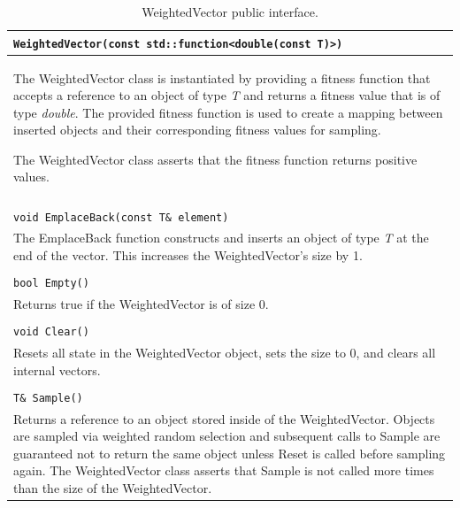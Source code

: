\documentclass[12pt]{article}
\begin{document}
  \begin{table}[htbp] \label{tab:wvpub}
    \caption{WeightedVector public interface.}
    \begin{tabular}{ | p{1.0\linewidth} | }
      \hline
      \verb|WeightedVector(const std::function<double(const T)>)| \\ \hline
      The WeightedVector class is instantiated by providing a fitness function
      that accepts a reference to an object of type \emph{T} and returns a
      fitness value that is of type \emph{double}. The provided fitness function
      is used to create a mapping between inserted objects and their
      corresponding fitness values for sampling.

      The WeightedVector class asserts that the fitness function returns positive
      values. \\ \hline

      \\ \hline

      \verb|void EmplaceBack(const T& element)| \\ \hline
      The EmplaceBack function constructs and inserts an object of type
      \emph{T} at the end of the vector. This increases the WeightedVector's
      size by 1. \\ \hline

      \\ \hline

      \verb|bool Empty()| \\ \hline
      Returns true if the WeightedVector is of size 0. \\  \hline

      \\ \hline

      \verb|void Clear()| \\ \hline
      Resets all state in the WeightedVector object, sets the size to 0, and
      clears all internal vectors. \\ \hline

      \\ \hline

      \verb|T& Sample()|\\ \hline

      Returns a reference to an object stored inside of the WeightedVector.
      Objects are sampled via weighted random selection and subsequent calls to
      Sample are guaranteed not to return the same object unless Reset is called
      before sampling again. The WeightedVector class asserts that Sample is not
      called more times than the size of the WeightedVector.\\ \hline


\end{tabular}
\end{table}
\end{document}

